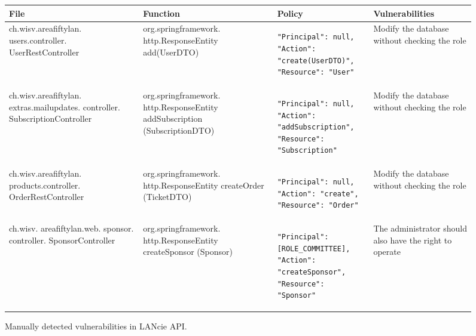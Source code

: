 \onecolumn
\begin{sidewaysfigure}[p]
  \caption{Manually detected vulnerabilities in LANcie API.}
  \label{tab:api}
  \centering
  \begin{tabular}{ |p{} | p{} | p{} | p{}|}
    \hline
    File                                                                         & Function & Policy & Vulnerabilities \\
    \hline
    ch.wisv.areafiftylan. users.controller. UserRestController                   &
    org.springframework. http.ResponseEntity add(UserDTO)                        &
    \begin{lstlisting}
"Principal": null,
"Action": "create(UserDTO)",
"Resource": "User"
    \end{lstlisting}                                                       &
    Modify the database without checking the role                                                                      \\
    \hline

    \hline
    ch.wisv.areafiftylan. extras.mailupdates. controller. SubscriptionController &
    org.springframework. http.ResponseEntity addSubscription (SubscriptionDTO)   &
    \begin{lstlisting}
"Principal": null,
"Action": "addSubscription",
"Resource": "Subscription"
    \end{lstlisting}                                                       &
    Modify the database without checking the role                                                                      \\
    \hline

    \hline
    ch.wisv.areafiftylan. products.controller. OrderRestController               &
    org.springframework. http.ResponseEntity createOrder (TicketDTO)             &
    \begin{lstlisting}
"Principal": null,
"Action": "create",
"Resource": "Order"
    \end{lstlisting}                                                       &
    Modify the database without checking the role                                                                      \\
    \hline

    \hline
    ch.wisv. areafiftylan.web. sponsor. controller. SponsorController            &
    org.springframework. http.ResponseEntity  createSponsor (Sponsor)            &
    \begin{lstlisting}
"Principal":[ROLE_COMMITTEE],
"Action": "createSponsor",
"Resource": "Sponsor"
    \end{lstlisting}                                                       &
    The administrator should also have the right to operate                                                            \\
    \hline
  \end{tabular}
\end{sidewaysfigure}
\twocolumn
